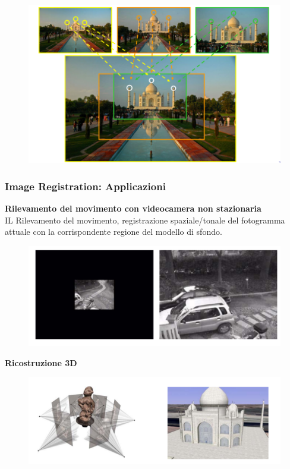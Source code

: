 \begin{figure}[H]
    \centering
    \includegraphics[width=\linewidth, keepaspectratio]{capitoli/immagini/imgs/image-registration.png}
\end{figure}

\newpage
\subsubsection{Image Registration: Applicazioni}

\textbf{Rilevamento del movimento con videocamera non stazionaria}
\\IL Rilevamento del movimento, registrazione spaziale/tonale del fotogramma attuale con la corrispondente regione del modello di
sfondo.

\begin{figure}[H]
    \centering
    \includegraphics[width=\linewidth, keepaspectratio]{capitoli/immagini/imgs/image-registration-applicazioni.png}
\end{figure}

\textbf{Ricostruzione 3D}
\begin{figure}[H]
    \centering
    \includegraphics[width=\linewidth, keepaspectratio]{capitoli/immagini/imgs/ricostruzione-3-d.png}
\end{figure}

